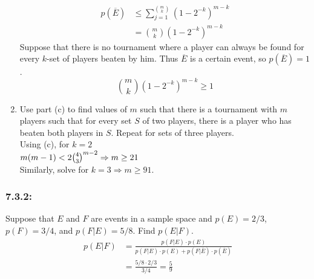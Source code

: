\documentclass[a4paper]{article}
\begin{document}
\begin{enumerate}[label=\alph*)]
\begin{align*}
		      p(\overline{E}) & \leq \sum_{j=1}^{m\choose k} (1-2^{-k})^{m-k} \\
		                      & = {m \choose k}(1-2^{-k})^{m-k}
	      \end{align*}
	      Suppose that there is no tournament where a player can always be found for every $k$-set of players beaten by him. Thus $\overline{E}$ is a certain event, so $p(\overline{E})=1$.
	      \begin{equation*}
		      {m \choose k}(1-2^{-k})^{m-k} \geq 1
	      \end{equation*}
	\item Use part (c) to find values of $m$ such that there is a tournament with $m$ players such that for every set $S$ of two players, there is a player who has beaten both players in $S$. Repeat for sets of three players. \\
	      Using (c), for $k=2$ \\
	      \begin{math}
		      m(m-1) < 2{4 \choose 3}^{m-2} \\
		      \Rightarrow m \geq 21
	      \end{math} \\
	      Similarly, solve for $k=3 \Rightarrow m \geq 91$.
\end{enumerate}

\subsubsection*{7.3.2:}
Suppose that $E$ and $F$ are events in a sample space and $p(E) = 2/3$, $p(F)=3/4$, and $p(F|E)=5/8$. Find $p(E|F)$.
\begin{align*}
	p(E|F) & = \frac{p(F|E)\cdot p(E)}{p(F|E)\cdot p(E) + p(F|\overline{E})\cdot p(\overline{E})} \\
	       & = \frac{5/8 \cdot 2/3}{3/4} = \frac{5}{9}
\end{align*}

\end{document}
